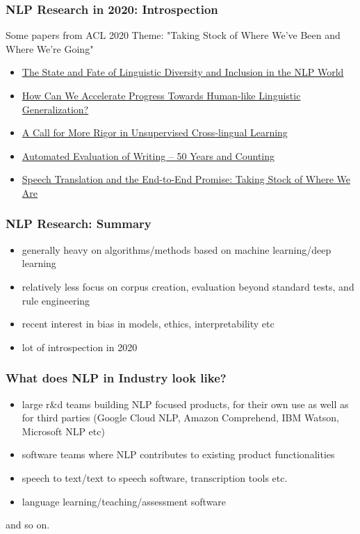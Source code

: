 \documentclass{beamer}
\begin{document}
\begin{frame}
\frametitle{NLP Research in 2020: Introspection}
Some papers from ACL 2020 Theme: "Taking Stock of Where We’ve Been and Where We’re Going"
\begin{itemize}
\item \href{https://www.aclweb.org/anthology/2020.acl-main.560/}{The State and Fate of Linguistic Diversity and Inclusion in the NLP World}
\item \href{https://www.aclweb.org/anthology/2020.acl-main.465/}{How Can We Accelerate Progress Towards Human-like Linguistic Generalization?}
\item \href{https://www.aclweb.org/anthology/2020.acl-main.658/}{A Call for More Rigor in Unsupervised Cross-lingual Learning}
\item \href{https://www.aclweb.org/anthology/2020.acl-main.697}{Automated Evaluation of Writing – 50 Years and Counting}
\item \href{https://www.aclweb.org/anthology/2020.acl-main.661}{Speech Translation and the End-to-End Promise: Taking Stock of Where We Are}
\end{itemize}  
\end{frame}

\begin{frame}
\frametitle{NLP Research: Summary}
\begin{itemize}
    \item generally heavy on algorithms/methods based on machine learning/deep learning
    \item relatively less focus on corpus creation, evaluation beyond standard tests, and rule engineering
    \item recent interest in bias in models, ethics, interpretability etc  
    \item lot of introspection in 2020 
\end{itemize}
\end{frame}

\begin{frame}
\frametitle{What does NLP in Industry look like?}
\begin{itemize}
    \item large r\&d teams building NLP focused products, for their own use as well as for third parties (Google Cloud NLP, Amazon Comprehend, IBM Watson, Microsoft NLP etc)
    \item software teams where NLP contributes to existing product functionalities 
    \item speech to text/text to speech software, transcription tools etc. 
    \item language learning/teaching/assessment software
\end{itemize}
and so on.
\end{frame}
\end{document}
